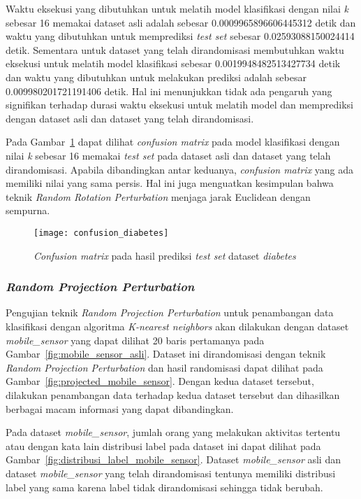 Waktu eksekusi yang dibutuhkan untuk melatih model klasifikasi dengan nilai \textit{k} sebesar 16 memakai dataset asli adalah sebesar 0.0009965896606445312 detik dan waktu yang dibutuhkan untuk memprediksi \textit{test set} sebesar 0.02593088150024414 detik. Sementara untuk dataset yang telah dirandomisasi membutuhkan waktu eksekusi untuk melatih model klasifikasi sebesar 0.0019948482513427734 detik dan waktu yang dibutuhkan untuk melakukan prediksi adalah sebesar 0.009980201721191406 detik. Hal ini menunjukkan tidak ada pengaruh yang signifikan terhadap durasi waktu eksekusi untuk melatih model dan memprediksi dengan dataset asli dan dataset yang telah dirandomisasi.

Pada Gambar~\ref{fig:confusion_diabetes} dapat dilihat \textit{confusion matrix} pada model klasifikasi dengan nilai \textit{k} sebesar 16 memakai \textit{test set} pada dataset asli dan dataset yang telah dirandomisasi. Apabila dibandingkan antar keduanya, \textit{confusion matrix} yang ada memiliki nilai yang sama persis. Hal ini juga menguatkan kesimpulan bahwa teknik \textit{Random Rotation Perturbation} menjaga jarak Euclidean dengan sempurna.

\begin{figure}
	\centering
	\texttt{[image: confusion\_diabetes]}
	\caption{\textit{Confusion matrix} pada hasil prediksi \textit{test set} dataset \textit{diabetes}}
	\label{fig:confusion_diabetes}
\end{figure}

\subsubsection{\textit{Random Projection Perturbation}}
\label{sec:pengujian-klasifikasi-rpp}

Pengujian teknik \textit{Random Projection Perturbation} untuk penambangan data klasifikasi dengan algoritma \textit{K-nearest neighbors} akan dilakukan dengan dataset \textit{mobile\_sensor} yang dapat dilihat 20 baris pertamanya pada Gambar~\ref{fig:mobile_sensor_asli}. Dataset ini dirandomisasi dengan teknik \textit{Random Projection Perturbation} dan hasil randomisasi dapat dilihat pada Gambar~\ref{fig:projected_mobile_sensor}. Dengan kedua dataset tersebut, dilakukan penambangan data terhadap kedua dataset tersebut dan dihasilkan berbagai macam informasi yang dapat dibandingkan.

Pada dataset \textit{mobile\_sensor}, jumlah orang yang melakukan aktivitas tertentu atau dengan kata lain distribusi label pada dataset ini dapat dilihat pada Gambar~\ref{fig:distribusi_label_mobile_sensor}. Dataset \textit{mobile\_sensor} asli dan dataset \textit{mobile\_sensor} yang telah dirandomisasi tentunya memiliki distribusi label yang sama karena label tidak dirandomisasi sehingga tidak berubah.

